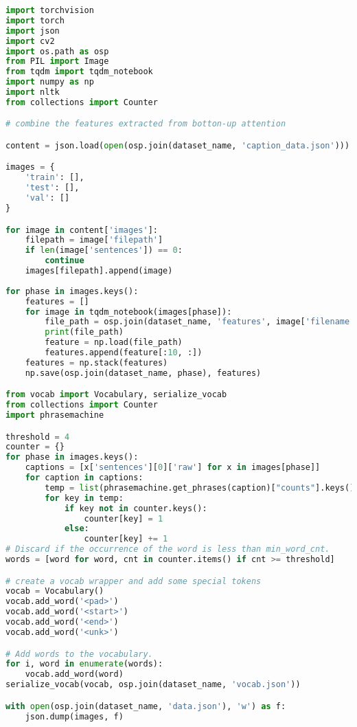 \begin{lstlisting}[language=Python]
import torchvision
import torch
import json
import cv2
import os.path as osp
from PIL import Image
from tqdm import tqdm_notebook
import numpy as np
import nltk
from collections import Counter

# combine the features extracted from botton-up attention

content = json.load(open(osp.join(dataset_name, 'caption_data.json')))

images = {
    'train': [],
    'test': [],
    'val': []
}

for image in content['images']:
    filepath = image['filepath']
    if len(image['sentences']) == 0:
        continue
    images[filepath].append(image)
    
for phase in images.keys():
    features = []
    for image in tqdm_notebook(images[phase]):
        file_path = osp.join(dataset_name, 'features', image['filename'].split('.')[0] + '.npy')
        print(file_path)
        feature = np.load(file_path)
        features.append(feature[:10, :])
    features = np.stack(features)
    np.save(osp.join(dataset_name, phase), features)

from vocab import Vocabulary, serialize_vocab
from collections import Counter
import phrasemachine

threshold = 4
counter = {}
for phase in images.keys():
    captions = [x['sentences'][0]['raw'] for x in images[phase]]
    for caption in captions:
        temp = list(phrasemachine.get_phrases(caption)["counts"].keys())
        for key in temp:
            if key not in counter.keys():
                counter[key] = 1
            else:
                counter[key] += 1
# Discard if the occurrence of the word is less than min_word_cnt.
words = [word for word, cnt in counter.items() if cnt >= threshold]

# create a vocab wrapper and add some special tokens
vocab = Vocabulary()
vocab.add_word('<pad>')
vocab.add_word('<start>')
vocab.add_word('<end>')
vocab.add_word('<unk>')

# Add words to the vocabulary.
for i, word in enumerate(words):
    vocab.add_word(word)
serialize_vocab(vocab, osp.join(dataset_name, 'vocab.json'))

with open(osp.join(dataset_name, 'data.json'), 'w') as f:
    json.dump(images, f)
\end{lstlisting}


